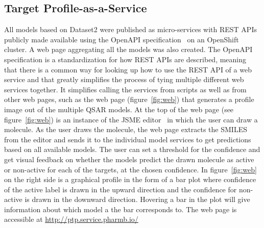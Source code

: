 \documentclass[10pt,article]{memoir}
\newcommand{\inlinetodo}[1]{{\color{magenta}\oldtodo[inline]{\color{white}\textsf{#1}}}}
\begin{document}
\subsection*{Target Profile-as-a-Service}
All models based on Dataset2 were published as micro-services with REST APIs
publicly made available using the OpenAPI specification~\cite{OpenAPI} on an OpenShift~\cite{OpenShift} cluster.
A web page aggregating all the models was also created. The OpenAPI
specification is a standardization for how REST APIs are described, meaning
that there is a common way for looking up how to use the REST API of a web
service and that greatly simplifies the process of tying multiple different web
services together. It simplifies calling the services from scripts as well as
from other web pages, such as the web page (figure~\ref{fig:web}) that generates a profile image out of
the multiple QSAR models. At the top of the web page (see figure~\ref{fig:web})
is an instance of the JSME editor~\cite{Bienfait2013} in which the user can
draw a molecule. As the user draws the molecule, the web page extracts the
SMILES from the editor and sends it to the individual model services to get predictions
based on all available models. The user can set a threshold for the confidence
and get visual feedback on whether the models predict the drawn molecule as
active or non-active for each of the targets, at the chosen confidence. In figure~\ref{fig:web} on
the right side is a graphical profile in the form of a bar plot where confidence of
the active label is drawn in the upward direction and the confidence for
non-active is drawn in the downward direction. Hovering a bar in the plot will
give information about which model a the bar corresponds to. The web page is
accessible at \url{http://ptp.service.pharmb.io/}
\end{document}
